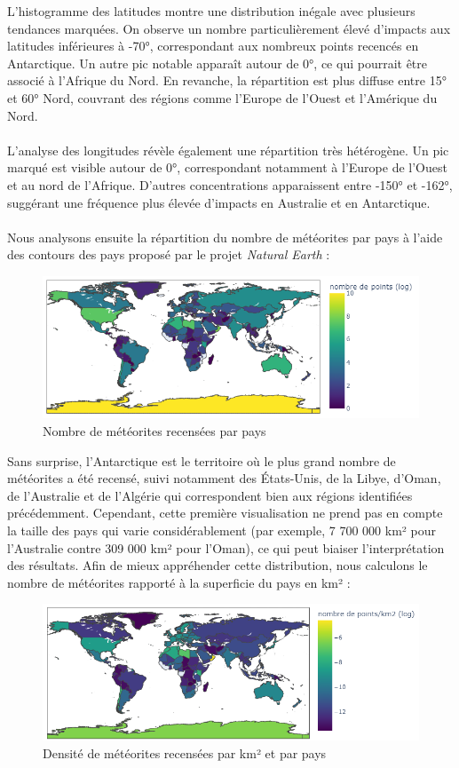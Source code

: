 \documentclass[12pt]{article}
\begin{document}
L'histogramme des latitudes montre une distribution inégale avec plusieurs tendances marquées. On observe un nombre particulièrement élevé d'impacts aux latitudes inférieures à -70°, correspondant aux nombreux points recencés en Antarctique. Un autre pic notable apparaît autour de 0°, ce qui pourrait être associé à l'Afrique du Nord. En revanche, la répartition est plus diffuse entre 15° et 60° Nord, couvrant des régions comme l'Europe de l'Ouest et l'Amérique du Nord.\\
\\
L'analyse des longitudes révèle également une répartition très hétérogène. Un pic marqué est visible autour de 0°, correspondant notamment à l'Europe de l'Ouest et au nord de l'Afrique. D'autres concentrations apparaissent entre -150° et -162°, suggérant une fréquence plus élevée d'impacts en Australie et en Antarctique.\\
\\
Nous analysons ensuite la répartition du nombre de météorites par pays à l'aide des contours des pays proposé par le projet \textit{Natural Earth} \cite{Natural_Earth} :
\begin{figure}[H]
 \centering 
\includegraphics[width=17cm]{Images/exploration/map_points_countries_avec_echelle.png}
 \caption{Nombre de météorites recensées par pays}
 \end{figure}
Sans surprise, l’Antarctique est le territoire où le plus grand nombre de météorites a été recensé, suivi notamment des États-Unis, de la Libye, d’Oman, de l’Australie et de l’Algérie qui correspondent bien aux régions identifiées précédemment. Cependant, cette première visualisation ne prend pas en compte la taille des pays qui varie considérablement (par exemple, 7 700 000 km² pour l’Australie contre 309 000 km² pour l'Oman), ce qui peut biaiser l’interprétation des résultats. Afin de mieux appréhender cette distribution, nous calculons le nombre de météorites rapporté à la superficie du pays en km² :
\begin{figure}[H] 
\centering
 \includegraphics[width=17cm]{Images/exploration/map_points_km2_avec_echelle.png}
 \caption{Densité de météorites recensées par km² et par pays}
 \end{figure}
\end{document}
